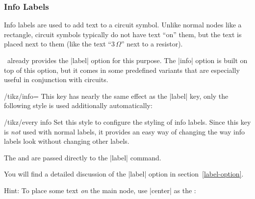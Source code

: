 \subsubsection{Info Labels}

Info labels are used to add text to a circuit symbol. Unlike normal nodes like
a rectangle, circuit symbols typically do not have text ``on'' them, but the
text is placed next to them (like the text ``$3\,\Omega$'' next to a resistor).

\tikzname\ already provides the |label| option for this purpose. The |info|
option is built on top of this option, but it comes in some predefined variants
that are especially useful in conjunction with circuits.

\begin{key}{/tikz/info=}
    This key has nearly the same effect as the |label| key, only the following
    style is used additionally automatically:
    \begin{stylekey}{/tikz/every info}
        Set this style to configure the styling of info labels. Since this
        key is \emph{not} used with normal labels, it provides an easy way
        of changing the way info labels look without changing other
        labels.
    \end{stylekey}
    The  and  are passed directly to the |label|
    command.
\begin{codeexample}[preamble={\usetikzlibrary{circuits.ee.IEC}}]
\begin{tikzpicture}[circuit ee IEC,every info/.style=red]
  \node [resistor,info=$3\Omega$] {};
\end{tikzpicture}
\end{codeexample}

    You will find a detailed discussion of the |label| option in
    section~\ref{label-option}.

    Hint: To place some text \emph{on} the main node, use |center| as the
    :
\begin{codeexample}[preamble={\usetikzlibrary{circuits.ee.IEC}}]
\end{codeexample}
\end{key}

